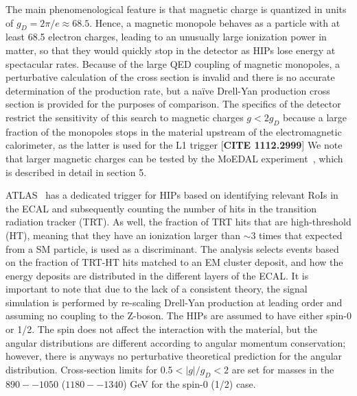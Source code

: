 The main phenomenological feature is that magnetic charge is quantized in units of $g_D = 2\pi/e \approx 68.5$. Hence, a magnetic monopole behaves as a particle with at least 68.5 electron charges, leading to an unusually large ionization power in matter, so that they would quickly stop in the detector as HIPs lose energy at spectacular rates. Because of the large QED coupling of magnetic monopoles, a perturbative calculation of the cross section is invalid and there is no accurate determination of the production rate, but a na\"ive Drell-Yan production cross section is provided for the purposes of comparison. The specifics of the detector restrict the sensitivity of this search to magnetic charges $g < 2 g_D$ because a large fraction of the monopoles stops in the material upstream of the electromagnetic calorimeter, as the latter is used for the L1 trigger [{\bf CITE 1112.2999}]
We note that larger magnetic charges can be tested by the MoEDAL experiment~\cite{MoEDAL:2016jlb}, which is described in detail in section 5.

ATLAS~\cite{Aad:2015kta}  has a dedicated trigger for HIPs based on identifying relevant RoIs in the ECAL and subsequently counting the number of hits in the transition radiation tracker (TRT). As well, the fraction of TRT hits that are high-threshold (HT), meaning that they have an ionization larger than $\sim3$ times that expected from a SM particle, is used as a discriminant. The analysis selects events based on the fraction of TRT-HT hits matched to an EM cluster deposit, and how the energy deposits are distributed in the different layers of the ECAL. It is important to note that due to the lack of a consistent theory, the signal simulation is performed by re-scaling Drell-Yan production at leading order and assuming no coupling to the Z-boson. The HIPs are assumed to have either spin-0 or 1/2. The spin does not affect the interaction with the material, but the angular distributions are different according to angular momentum conservation; however, there is anyways no perturbative theoretical prediction for the angular distribution. Cross-section limits for $0.5 < |g|/g_D < 2$ are set for masses in the $890--1050$ ($1180--1340$) GeV for the spin-0 (1/2) case.

